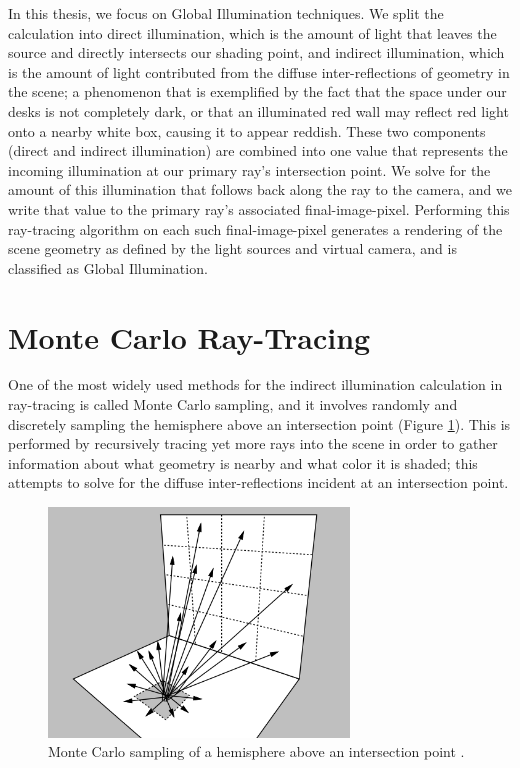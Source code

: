 In this thesis, we focus on Global Illumination techniques. We split the calculation into direct illumination, which is the amount of light that leaves the source and directly intersects our shading point, and indirect illumination, which is the amount of light contributed from the diffuse inter-reflections of geometry in the scene; a phenomenon that is exemplified by the fact that the space under our desks is not completely dark, or that an illuminated red wall may reflect red light onto a nearby white box, causing it to appear reddish. These two components (direct and indirect illumination) are combined into one value that represents the incoming illumination at our primary ray's intersection point. We solve for the amount of this illumination that follows back along the ray to the camera, and we write that value to the primary ray's associated final-image-pixel. Performing this ray-tracing algorithm on each such final-image-pixel generates a rendering of the scene geometry as defined by the light sources and virtual camera, and is classified as Global Illumination.

\section{Monte Carlo Ray-Tracing}
One of the most widely used methods for the indirect illumination calculation in ray-tracing is called Monte Carlo sampling, and it involves randomly and discretely sampling the hemisphere above an intersection point (Figure \ref{fig:monte_carlo}). This is performed by recursively tracing yet more rays into the scene in order to gather information about what geometry is nearby and what color it is shaded; this attempts to solve for the diffuse inter-reflections incident at an intersection point. 

\begin{figure}[h]
   \centering
   \includegraphics[width=80mm]{../img/shirley_monte_carlo.png}
   \captionfonts
   \caption{Monte Carlo sampling of a hemisphere above an intersection point \cite{bib:shirley1991}.}
   \label{fig:monte_carlo}
\end{figure}

